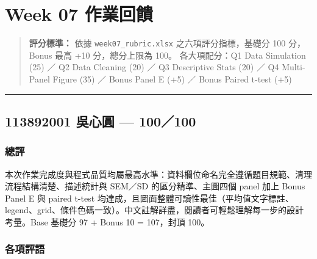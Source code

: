 \documentclass[
  14pt,
]{extarticle}
\author{}
\date{}
\begin{document}
\hypertarget{week-07-ux4f5cux696dux56deux994b}{%
\section{Week 07 作業回饋}\label{week-07-ux4f5cux696dux56deux994b}}

\begin{quote}
\textbf{評分標準：} 依據 \texttt{week07\_rubric.xlsx}
之六項評分指標，基礎分 100 分，Bonus 最高 +10 分，總分上限為 100。
各大項配分：Q1 Data Simulation (25) ／ Q2 Data Cleaning (20) ／ Q3
Descriptive Stats (20) ／ Q4 Multi-Panel Figure (35) ／ Bonus Panel E
(+5) ／ Bonus Paired t-test (+5)
\end{quote}

\begin{center}\rule{0.5\linewidth}{0.5pt}\end{center}

\hypertarget{ux5433ux5fc3ux5713-100100}{%
\subsection{113892001 吳心圓 ---
100／100}\label{ux5433ux5fc3ux5713-100100}}

\hypertarget{ux7e3dux8a55}{%
\subsubsection{總評}\label{ux7e3dux8a55}}

本次作業完成度與程式品質均屬最高水準：資料欄位命名完全遵循題目規範、清理流程結構清楚、描述統計與
SEM／SD 的區分精準、主圖四個 panel 加上 Bonus Panel E 與 paired t-test
均達成，且圖面整體可讀性最佳（平均值文字標註、legend、grid、條件色碼一致）。中文註解詳盡，閱讀者可輕鬆理解每一步的設計考量。Base
基礎分 97 + Bonus 10 = 107，封頂 100。

\hypertarget{ux5404ux9805ux8a55ux8a9e}{%
\subsubsection{各項評語}\label{ux5404ux9805ux8a55ux8a9e}}
\end{document}
